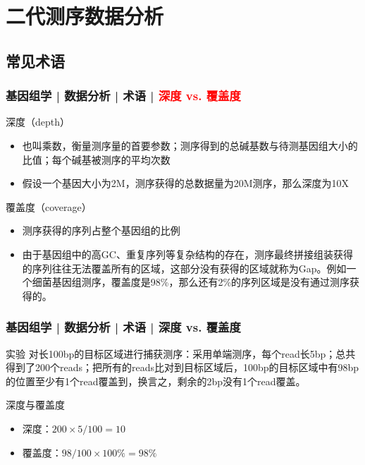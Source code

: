 \section{二代测序数据分析}
\subsection{常见术语}
\begin{frame}
  \frametitle{基因组学 | 数据分析 | 术语 | \textcolor{red}{深度 vs. 覆盖度}}
  \begin{block}{深度（depth）}
    \begin{itemize}
      \item 也叫乘数，衡量测序量的首要参数；测序得到的总碱基数与待测基因组大小的比值；每个碱基被测序的平均次数
      \item 假设一个基因大小为2M，测序获得的总数据量为20M测序，那么深度为10X
    \end{itemize}
  \end{block}
  \pause
  \begin{block}{覆盖度（coverage）}
    \begin{itemize}
      \item 测序获得的序列占整个基因组的比例
      \item 由于基因组中的高GC、重复序列等复杂结构的存在，测序最终拼接组装获得的序列往往无法覆盖所有的区域，这部分没有获得的区域就称为Gap。例如一个细菌基因组测序，覆盖度是98\%，那么还有2\%的序列区域是没有通过测序获得的。
    \end{itemize}
  \end{block}
\end{frame}

\begin{frame}
  \frametitle{基因组学 | 数据分析 | 术语 | 深度 vs. 覆盖度}
  \begin{block}{实验}
对长100bp的目标区域进行捕获测序：采用单端测序，每个read长5bp；总共得到了200个reads；把所有的reads比对到目标区域后，100bp的目标区域中有98bp的位置至少有1个read覆盖到，换言之，剩余的2bp没有1个read覆盖。
  \end{block}
  \pause
  \begin{block}{深度与覆盖度}
    \begin{itemize}
      \item 深度：$200 \times 5 / 100 = 10$
      \item 覆盖度：$98 / 100 \times 100\% = 98\%$
    \end{itemize}
  \end{block}
\end{frame}


